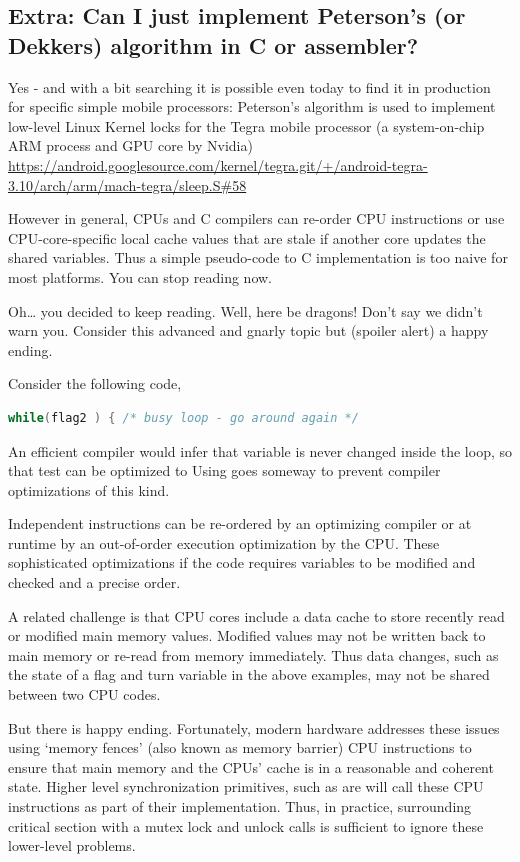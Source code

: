 \subsection{Extra: Can I just implement Peterson's (or Dekkers) algorithm in C or assembler?}

Yes - and with a bit searching it is possible even today to find it in production for specific simple mobile processors: Peterson's algorithm is used to implement low-level Linux Kernel locks for the Tegra mobile processor (a system-on-chip ARM process and GPU core by Nvidia) \href{Link to Lock Source}{https://android.googlesource.com/kernel/tegra.git/+/android-tegra-3.10/arch/arm/mach-tegra/sleep.S\#58}

However in general, CPUs and C compilers can re-order CPU instructions or use CPU-core-specific local cache values that are stale if another core updates the shared variables. Thus a simple pseudo-code to C implementation is too naive for most platforms. You can stop reading now.

Oh\ldots{} you decided to keep reading. Well, here be dragons! Don't say we didn't warn you. Consider this advanced and gnarly topic but (spoiler alert) a happy ending.

Consider the following code,

\begin{lstlisting}[language=C]
while(flag2 ) { /* busy loop - go around again */
\end{lstlisting}

An efficient compiler would infer that  variable is never changed inside the loop, so that test can be optimized to  Using  goes someway to prevent compiler optimizations of this kind.

Independent instructions can be re-ordered by an optimizing compiler or at runtime by an out-of-order execution optimization by the CPU. These sophisticated optimizations if the code requires variables to be modified and checked and a precise order.

A related challenge is that CPU cores include a data cache to store recently read or modified main memory values. Modified values may not be written back to main memory or re-read from memory immediately. Thus data changes, such as the state of a flag and turn variable in the above examples, may not be shared between two CPU codes.

But there is happy ending. Fortunately, modern hardware addresses these issues using `memory fences' (also known as memory barrier) CPU instructions to ensure that main memory and the CPUs' cache is in a reasonable and coherent state. Higher level synchronization primitives, such as  are will call these CPU instructions as part of their implementation. Thus, in practice, surrounding critical section with a mutex lock and unlock calls is sufficient to ignore these lower-level problems.

